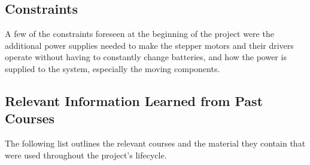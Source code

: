 \subsection{Constraints}
A few of the constraints foreseen at the beginning of the project were the additional power supplies needed to make the stepper motors and their drivers operate without having to constantly change batteries, and how the power is supplied to the system, especially the moving components.

\subsection{Relevant Information Learned from Past Courses}
The following list outlines the relevant courses and the material they contain that were used throughout the project's lifecycle.\par
